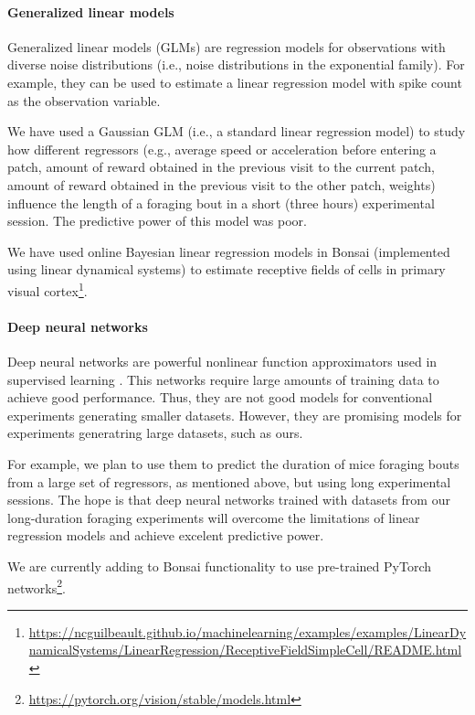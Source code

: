 \paragraph{Generalized linear models}

Generalized linear models (GLMs) are regression models for observations with diverse
noise distributions (i.e., noise distributions in the exponential family). For
example, they can be used to estimate a linear regression model with spike
count as the observation variable.

We have used a Gaussian GLM (i.e., a standard linear regression model) to
study how different regressors (e.g., average speed or acceleration
before entering a patch, amount of reward obtained in the previous visit to the
current patch, amount of reward obtained in the previous visit to the other
patch, weights) influence the length of a foraging bout in a short (three
hours) experimental session. The predictive power of this model was poor.

We have used online Bayesian linear regression models in Bonsai (implemented
using linear dynamical systems) to estimate
receptive fields of cells in primary visual
cortex\footnote{\url{https://ncguilbeault.github.io/machinelearning/examples/examples/LinearDynamicalSystems/LinearRegression/ReceptiveFieldSimpleCell/README.html}}.

\paragraph{Deep neural networks}

Deep neural networks are powerful nonlinear function approximators used in
supervised learning \citep{goodfellowEtAl16}. This networks require large
amounts of training data to achieve good performance. Thus, they are not good
models for conventional experiments generating smaller datasets. However, they
are promising models for experiments generatring large datasets, such as ours.

For example, we plan to use them to predict the duration of mice foraging bouts from a
large set of regressors, as mentioned above, but using long experimental
sessions. The hope is that deep neural networks trained with datasets
from our long-duration foraging experiments will overcome the limitations of
linear regression models and achieve excelent predictive power.

We are currently adding to Bonsai functionality to use pre-trained PyTorch
networks\footnote{\url{https://pytorch.org/vision/stable/models.html}}.

